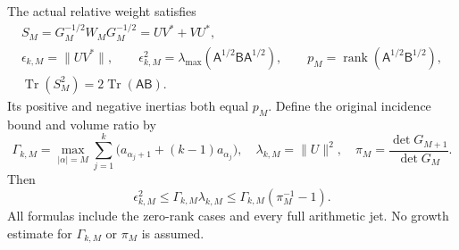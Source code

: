 \begin{theorem}
The actual relative weight satisfies
\[
 \begin{gathered}
 S_M=G_M^{-1/2}W_MG_M^{-1/2}=UV^*+VU^*,\\
 \boxed{\epsilon_{k,M}=\|UV^*\|,\qquad
 \epsilon_{k,M}^2=
       \lambda_{\max}(\mathsf A^{1/2}\mathsf B\mathsf A^{1/2}),}\qquad
 p_M=\operatorname{rank}(\mathsf A^{1/2}\mathsf B^{1/2}),\\
 \operatorname{Tr}(S_M^2)=2\operatorname{Tr}(\mathsf A\mathsf B).
 \end{gathered}
 \tag{AP.15}
\]
Its positive and negative inertias both equal \(p_M\).
Define the original incidence bound and volume ratio by
\[
 \Gamma_{k,M}=\max_{|\alpha|=M}
     \sum_{j=1}^k\bigl(a_{\alpha_j+1}+(k-1)a_{\alpha_j}\bigr),
 \quad \lambda_{k,M}=\|U\|^2,
 \quad \pi_M=\frac{\det G_{M+1}}{\det G_M}.
 \tag{AP.16}
\]
Then
\[
 \boxed{\epsilon_{k,M}^2
      \le\Gamma_{k,M}\lambda_{k,M}
      \le\Gamma_{k,M}(\pi_M^{-1}-1).}
 \tag{AP.17}
\]
All formulas include the zero-rank cases and every full arithmetic
jet.  No growth estimate for \(\Gamma_{k,M}\) or \(\pi_M\)
is assumed.
\end{theorem}
